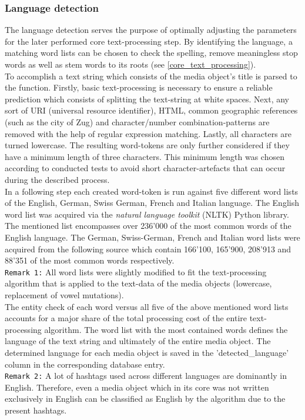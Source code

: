 \subsubsection{Language detection} \label{langauge_detection}
The language detection serves the purpose of optimally adjusting the parameters for the later performed core text-processing step. By identifying the language, a matching word lists can be chosen to check the spelling, remove meaningless stop words as well as stem words to its roots (see \ref{core_text_processing}).\\
To accomplish a text string which consists of the media object's title is parsed to the function. Firstly, basic text-processing is necessary to ensure a reliable prediction which consists of splitting the text-string at white spaces. Next, any sort of URI (universal resource identifier), HTML, common geographic references (such as the city of Zug) and character/number combination-patterns are removed with the help of regular expression matching. Lastly, all characters are turned lowercase. The resulting word-tokens are only further considered if they have a minimum length of three characters. This minimum length was chosen according to conducted tests to avoid short character-artefacts that can occur during the described process.\\
In a following step each created word-token is run against five different word lists of the English, German, Swiss German, French and Italian language.
The English word list was acquired via the \textit{natural language toolkit} (NLTK) Python library. The mentioned list encompasses over 236'000 of the most common words of the English language.
The German, Swiss-German, French and Italian word lists were acquired from the following source \parencite{Geooffwicks} which contain 166'100, 165'900, 208'913 and 88'351 of the most common words respectively.\\
\newline
\texttt{Remark 1:} All word lists were slightly modified to fit the text-processing algorithm that is applied to the text-data of the media objects (lowercase, replacement of vowel mutations).\\
\newline
The entity check of each word versus all five of the above mentioned word lists accounts for a major share of the total processing cost of the entire text-processing algorithm. The word list with the most contained words defines the language of the text string and ultimately of the entire media object. The determined language for each media object is saved in the 'detected\_language' column in the corresponding database entry.\\
\newline
\texttt{Remark 2:} A lot of hashtags used across different languages are dominantly in English. Therefore, even a media object which in its core was not written exclusively in English can be classified as English by the algorithm due to the present hashtags.

